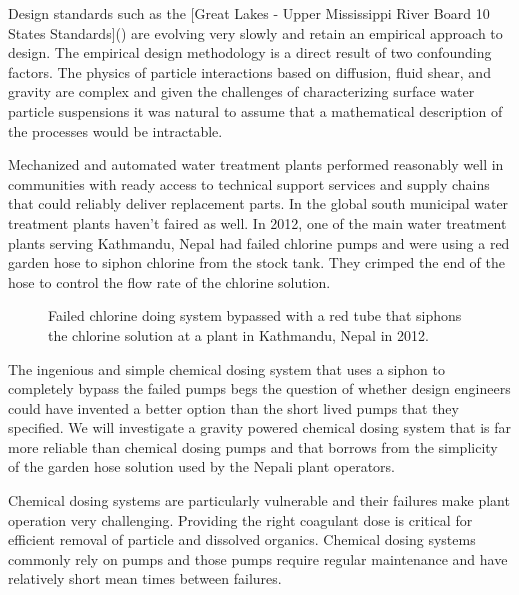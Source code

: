 \documentclass[letterpaper,10pt,english]{sphinxmanual}
\let\sphinxpxdimen\pdfpxdimen\else\newdimen\sphinxpxdimen
\begin{document}
Design standards such as the {[}Great Lakes - Upper Mississippi River Board 10 States Standards{]}() are evolving very slowly and retain an empirical approach to design. The empirical design methodology is a direct result of two confounding factors. The physics of particle interactions based on diffusion, fluid shear, and gravity are complex and given the challenges of characterizing surface water particle suspensions it was natural to assume that a mathematical description of the processes would be intractable.

Mechanized and automated water treatment plants performed reasonably well in communities with ready access to technical support services and supply chains that could reliably deliver replacement parts. In the global south municipal water treatment plants haven’t faired as well. In 2012, one of the main water treatment plants serving Kathmandu, Nepal had failed chlorine pumps and were using a red garden hose to siphon chlorine from the stock tank. They crimped the end of the hose to control the flow rate of the chlorine solution.

\begin{figure}[htbp]
\centering
\capstart

\noindent\sphinxincludegraphics[width=300\sphinxpxdimen]{{Kathmandu_chemical_feed_room}.png}
\caption{Failed chlorine doing system bypassed with a red tube that siphons the chlorine solution at a plant in Kathmandu, Nepal in 2012.}\label{\detokenize{Introduction/Introduction:id20}}\label{\detokenize{Introduction/Introduction:figure-kathmandu-chemical-feed-room}}\end{figure}

The ingenious and simple chemical dosing system that uses a siphon to completely bypass the failed pumps begs the question of whether design engineers could have invented a better option than the short lived pumps that they specified. We will investigate a gravity powered chemical dosing system that is far more reliable than chemical dosing pumps and that borrows from the simplicity of the garden hose solution used by the Nepali plant operators.

Chemical dosing systems are particularly vulnerable and their failures make plant operation very challenging. Providing the right coagulant dose is critical for efficient removal of particle and dissolved organics. Chemical dosing systems commonly rely on pumps and those pumps require regular maintenance and have relatively short mean times between failures.
\end{document}
